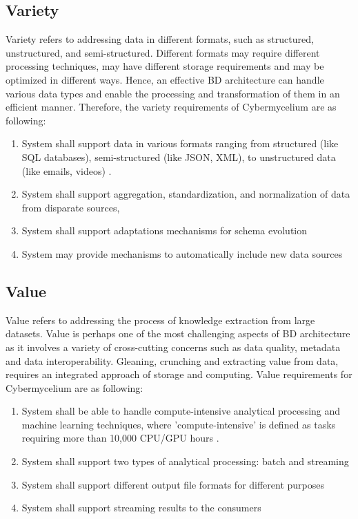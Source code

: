 \documentclass[review]{elsarticle}
\begin{document}
\subsection{Variety}

Variety refers to addressing data in different formats, such as structured, unstructured, and semi-structured. Different formats may require different processing techniques, may have different storage requirements and may be optimized in different ways. Hence, an effective BD architecture can handle various data types and enable the processing and transformation of them in an efficient manner. Therefore, the variety requirements of Cybermycelium are as following: 

\begin{enumerate}[label=\textbf{Var-\arabic*}]
    \item System shall support data in various formats ranging from structured (like SQL databases), semi-structured (like JSON, XML), to unstructured data (like emails, videos) \cite{ryzko2020modern}.
    \item System shall support aggregation, standardization, and normalization of data from disparate sources,
    \item System shall support adaptations mechanisms for schema evolution
    \item System may provide mechanisms to automatically include new data sources
\end{enumerate}


\subsection{Value}

Value refers to addressing the process of knowledge extraction from large datasets. Value is perhaps one of the most challenging aspects of BD architecture as it involves a variety of cross-cutting concerns such as data quality, metadata and data interoperability. Gleaning, crunching and extracting value from data, requires an integrated approach of storage and computing. Value requirements for Cybermycelium are as following:

\begin{enumerate}[label=\textbf{Val-\arabic*}]
    \item System shall be able to handle compute-intensive analytical processing and machine learning techniques, where 'compute-intensive' is defined as tasks requiring more than 10,000 CPU/GPU hours \cite{warren2015big}.
    \item System shall support two types of analytical processing: batch and streaming
    \item System shall support different output file formats for different purposes
    \item System shall support streaming results to the consumers 
\end{enumerate}
\end{document}
